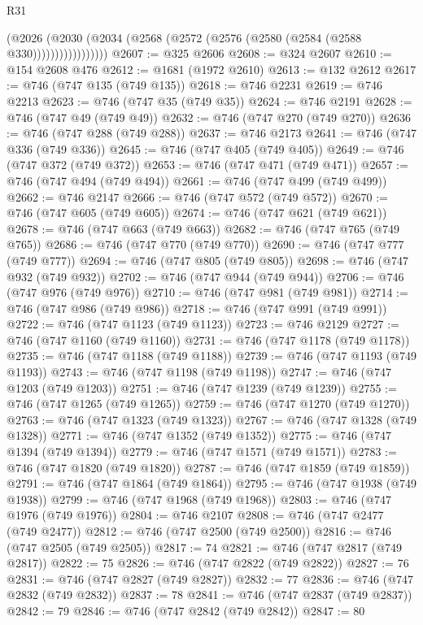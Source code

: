 \begin{lexlean}{R31}
\begin{coremodule}
                    (@2026
                      (@2030 (@2034 (@2568 (@2572 (@2576 (@2580 (@2584 (@2588 @330)))))))))))))))))
@2607 := @325 @2606
@2608 := @324 @2607
@2610 := @154 @2608 @476
@2612 := @1681 (@1972 @2610)
@2613 := @132 @2612
@2617 := @746 (@747 @135 (@749 @135))
@2618 := @746 @2231
@2619 := @746 @2213
@2623 := @746 (@747 @35 (@749 @35))
@2624 := @746 @2191
@2628 := @746 (@747 @49 (@749 @49))
@2632 := @746 (@747 @270 (@749 @270))
@2636 := @746 (@747 @288 (@749 @288))
@2637 := @746 @2173
@2641 := @746 (@747 @336 (@749 @336))
@2645 := @746 (@747 @405 (@749 @405))
@2649 := @746 (@747 @372 (@749 @372))
@2653 := @746 (@747 @471 (@749 @471))
@2657 := @746 (@747 @494 (@749 @494))
@2661 := @746 (@747 @499 (@749 @499))
@2662 := @746 @2147
@2666 := @746 (@747 @572 (@749 @572))
@2670 := @746 (@747 @605 (@749 @605))
@2674 := @746 (@747 @621 (@749 @621))
@2678 := @746 (@747 @663 (@749 @663))
@2682 := @746 (@747 @765 (@749 @765))
@2686 := @746 (@747 @770 (@749 @770))
@2690 := @746 (@747 @777 (@749 @777))
@2694 := @746 (@747 @805 (@749 @805))
@2698 := @746 (@747 @932 (@749 @932))
@2702 := @746 (@747 @944 (@749 @944))
@2706 := @746 (@747 @976 (@749 @976))
@2710 := @746 (@747 @981 (@749 @981))
@2714 := @746 (@747 @986 (@749 @986))
@2718 := @746 (@747 @991 (@749 @991))
@2722 := @746 (@747 @1123 (@749 @1123))
@2723 := @746 @2129
@2727 := @746 (@747 @1160 (@749 @1160))
@2731 := @746 (@747 @1178 (@749 @1178))
@2735 := @746 (@747 @1188 (@749 @1188))
@2739 := @746 (@747 @1193 (@749 @1193))
@2743 := @746 (@747 @1198 (@749 @1198))
@2747 := @746 (@747 @1203 (@749 @1203))
@2751 := @746 (@747 @1239 (@749 @1239))
@2755 := @746 (@747 @1265 (@749 @1265))
@2759 := @746 (@747 @1270 (@749 @1270))
@2763 := @746 (@747 @1323 (@749 @1323))
@2767 := @746 (@747 @1328 (@749 @1328))
@2771 := @746 (@747 @1352 (@749 @1352))
@2775 := @746 (@747 @1394 (@749 @1394))
@2779 := @746 (@747 @1571 (@749 @1571))
@2783 := @746 (@747 @1820 (@749 @1820))
@2787 := @746 (@747 @1859 (@749 @1859))
@2791 := @746 (@747 @1864 (@749 @1864))
@2795 := @746 (@747 @1938 (@749 @1938))
@2799 := @746 (@747 @1968 (@749 @1968))
@2803 := @746 (@747 @1976 (@749 @1976))
@2804 := @746 @2107
@2808 := @746 (@747 @2477 (@749 @2477))
@2812 := @746 (@747 @2500 (@749 @2500))
@2816 := @746 (@747 @2505 (@749 @2505))
@2817 := 74
@2821 := @746 (@747 @2817 (@749 @2817))
@2822 := 75
@2826 := @746 (@747 @2822 (@749 @2822))
@2827 := 76
@2831 := @746 (@747 @2827 (@749 @2827))
@2832 := 77
@2836 := @746 (@747 @2832 (@749 @2832))
@2837 := 78
@2841 := @746 (@747 @2837 (@749 @2837))
@2842 := 79
@2846 := @746 (@747 @2842 (@749 @2842))
@2847 := 80

\end{coremodule}
\end{lexlean}

